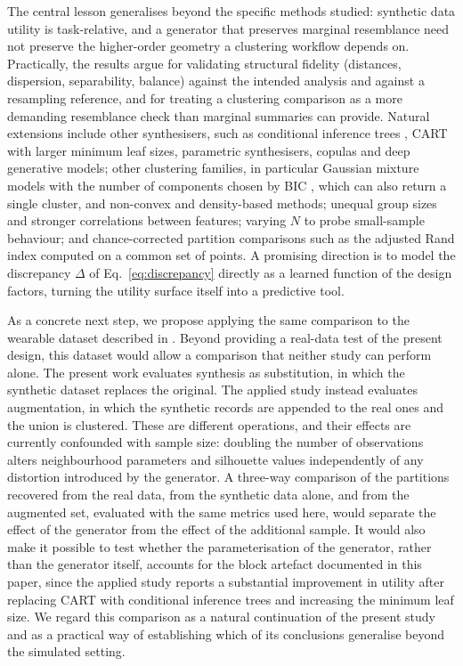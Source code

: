 \documentclass[pdflatex,referee]{sn-jnl}
\begin{document}
The central lesson generalises beyond the specific methods studied: synthetic
data utility is task-relative, and a generator that preserves marginal
resemblance need not preserve the higher-order geometry a clustering workflow
depends on. Practically, the results argue for validating structural fidelity
(distances, dispersion, separability, balance) against the intended analysis
and against a resampling reference, and for treating a clustering comparison
as a more demanding resemblance check than marginal summaries can provide.
Natural extensions include other synthesisers, such as conditional inference
trees \citep{hothorn2006}, CART with larger minimum leaf sizes, parametric
synthesisers, copulas and deep generative models; other clustering families,
in particular Gaussian mixture models with the number of components chosen by
BIC \citep{fraley2002,scrucca2016}, which can also return a single cluster, and
non-convex and density-based methods; unequal group sizes and stronger
correlations between features; varying $N$ to probe small-sample behaviour;
and chance-corrected partition comparisons such as the adjusted Rand index
\citep{hubert1985} computed on a common set of points. A promising direction
is to model the discrepancy $\Delta$ of Eq.~\eqref{eq:discrepancy} directly as
a learned function of the design factors, turning the utility surface itself
into a predictive tool.

As a concrete next step, we propose applying the same comparison to the
wearable dataset described in
\citet{vidiella2025}. Beyond providing a real-data test of the present design, this dataset
would allow a comparison that neither study can perform alone. The present work
evaluates synthesis as substitution, in which the synthetic dataset replaces
the original. The applied study instead evaluates augmentation, in which the
synthetic records are appended to the real ones and the union is clustered.
These are different operations, and their effects are currently confounded
with sample size: doubling the number of observations alters neighbourhood
parameters and silhouette values independently of any distortion introduced by
the generator. A three-way comparison of the partitions recovered from the real
data, from the synthetic data alone, and from the augmented set, evaluated with
the same metrics used here, would separate the effect of the generator from
the effect of the additional sample. It would also make it possible to test
whether the parameterisation of the generator, rather than the generator
itself, accounts for the block artefact documented in this paper, since the
applied study reports a substantial improvement in utility after replacing
CART with conditional inference trees \citep{hothorn2006} and increasing the
minimum leaf size. We regard this comparison as a natural continuation of the
present study and as a practical way of establishing which of its conclusions
generalise beyond the simulated setting.
\end{document}

